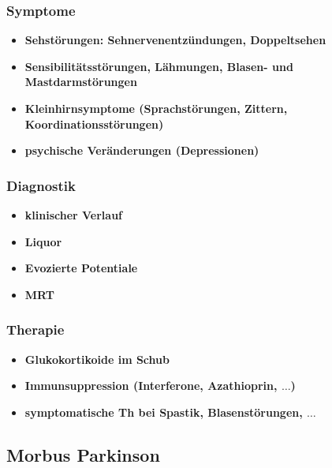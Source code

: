 		\subsubsection*{Symptome}
			\begin{itemize}
				\item \textbf{Sehstörungen: Sehnervenentzündungen, Doppeltsehen}
				\item \textbf{Sensibilitätsstörungen, Lähmungen, Blasen- und Mastdarmstörungen}
				\item \textbf{Kleinhirnsymptome (Sprachstörungen, Zittern, Koordinationsstörungen)}
				\item \textbf{psychische Veränderungen (Depressionen)}
			\end{itemize}
		\subsubsection*{Diagnostik}
			\begin{itemize}
				\item \textbf{klinischer Verlauf}
				\item \textbf{Liquor}
				\item \textbf{Evozierte Potentiale}
				\item \textbf{MRT}
			\end{itemize}
		\subsubsection*{Therapie}
			\begin{itemize}
				\item \textbf{Glukokortikoide im Schub}
				\item \textbf{Immunsuppression (Interferone, Azathioprin, $\dots$)}
				\item \textbf{symptomatische Th bei Spastik, Blasenstörungen, $\dots$}
			\end{itemize}
	\subsection*{Morbus Parkinson}